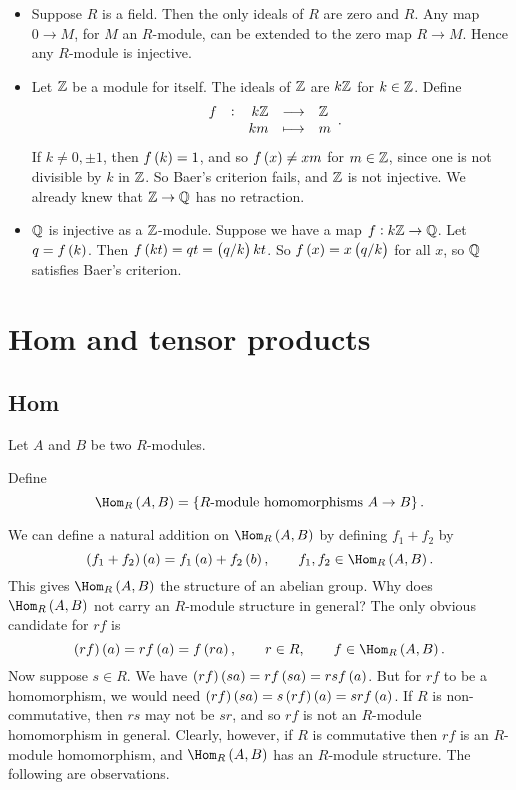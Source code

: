\begin{example*}
\hfill
\begin{itemize}
\item Suppose $ R $ is a field. Then the only ideals of $ R $ are zero and $ R $. Any map $ 0 \to M $, for $ M $ an $ R $-module, can be extended to the zero map $ R \to M $. Hence any $ R $-module is injective.
\item Let $ \mathbb{Z} $ be a module for itself. The ideals of $ \mathbb{Z} $ are $ k\mathbb{Z} $ for $ k \in \mathbb{Z} $. Define
$$ \function[f]{k\ZZ}{\ZZ}{km}{m}. $$
If $ k \ne 0, \pm 1 $, then $ f\br{k} = 1 $, and so $ f\br{x} \ne xm $ for $ m \in \mathbb{Z} $, since one is not divisible by $ k $ in $ \mathbb{Z} $. So Baer's criterion fails, and $ \mathbb{Z} $ is not injective. We already knew that $ \mathbb{Z} \to \mathbb{Q} $ has no retraction.
\item $ \mathbb{Q} $ is injective as a $ \mathbb{Z} $-module. Suppose we have a map $ f : k\mathbb{Z} \to \mathbb{Q} $. Let $ q = f\br{k} $. Then $ f\br{kt} = qt = \br{q / k}kt $. So $ f\br{x} = x\br{q / k} $ for all $ x $, so $ \mathbb{Q} $ satisfies Baer's criterion.
\end{itemize}
\end{example*}

\pagebreak

\section{Hom and tensor products}

\subsection{Hom}


Let $ A $ and $ B $ be two $ R $-modules.

\begin{definition}
Define
$$ \Hom_R\br{A, B} = \cbr{\text{$ R $-module homomorphisms} \ A \to B}. $$
\end{definition}

We can define a natural addition on $ \Hom_R\br{A, B} $ by defining $ f_1 + f_2 $ by
$$ \br{f_1 + f_2}\br{a} = f_1\br{a} + f_2\br{b}, \qquad f_1, f_2 \in \Hom_R\br{A, B}. $$
This gives $ \Hom_R\br{A, B} $ the structure of an abelian group. Why does $ \Hom_R\br{A, B} $ not carry an $ R $-module structure in general? The only obvious candidate for $ rf $ is
$$ \br{rf}\br{a} = rf\br{a} = f\br{ra}, \qquad r \in R, \qquad f \in \Hom_R\br{A, B}. $$
Now suppose $ s \in R $. We have $ \br{rf}\br{sa} = rf\br{sa} = rsf\br{a} $. But for $ rf $ to be a homomorphism, we would need $ \br{rf}\br{sa} = s\br{rf}\br{a} = srf\br{a} $. If $ R $ is non-commutative, then $ rs $ may not be $ sr $, and so $ rf $ is not an $ R $-module homomorphism in general. Clearly, however, if $ R $ is commutative then $ rf $ is an $ R $-module homomorphism, and $ \Hom_R\br{A, B} $ has an $ R $-module structure. The following are observations.

